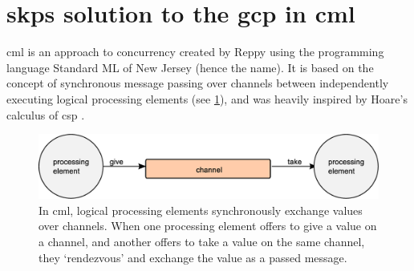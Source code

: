 \section[\Glsdesc{skps} solution to the \glsdesc{gcp} in \glsdesc{cml}][\Gls{skps} solution to the \gls{gcp} in \gls{cml}]{\label{sec:gcol:cml}\Glsdesc{skps} solution to the \glsdesc{gcp} in \glsdesc{cml}}
\Gls{cml} is an approach to concurrency created by Reppy \cite{Reppy1991} using the programming language Standard ML of New Jersey (hence the name).  It is based on the concept of synchronous message passing over channels between independently executing logical processing elements \cite{Panangaden1997} (see \cref{fig:gcol:cml_exchange}), and was heavily inspired by Hoare's calculus of \gls{csp} \cite{Hoare1985}.  

\begin{figure}
    \centering
    \includegraphics[width=\textwidth]{chapters/gcol/figs/cml_exchange.eps}
    \caption[Diagram of the message-passing primitive in ]{In \gls{cml}, logical processing elements synchronously exchange values over channels.  When one processing element offers to give a value on a channel, and another offers to take a value on the same channel, they ‘rendezvous’ and exchange the value as a passed message.}
    \label{fig:gcol:cml_exchange}
\end{figure}



